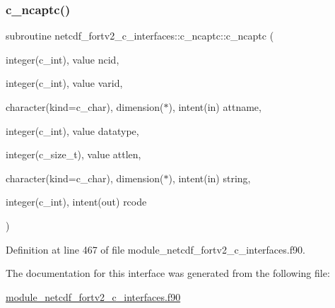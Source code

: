 \subsubsection{\texorpdfstring{c\+\_\+ncaptc()}{c\_ncaptc()}}
{\footnotesize\ttfamily subroutine netcdf\+\_\+fortv2\+\_\+c\+\_\+interfaces\+::c\+\_\+ncaptc\+::c\+\_\+ncaptc (\begin{DoxyParamCaption}\item[{integer(c\+\_\+int), value}]{ncid,  }\item[{integer(c\+\_\+int), value}]{varid,  }\item[{character(kind=c\+\_\+char), dimension($\ast$), intent(in)}]{attname,  }\item[{integer(c\+\_\+int), value}]{datatype,  }\item[{integer(c\+\_\+size\+\_\+t), value}]{attlen,  }\item[{character(kind=c\+\_\+char), dimension($\ast$), intent(in)}]{string,  }\item[{integer(c\+\_\+int), intent(out)}]{rcode }\end{DoxyParamCaption})}



Definition at line 467 of file module\+\_\+netcdf\+\_\+fortv2\+\_\+c\+\_\+interfaces.\+f90.



The documentation for this interface was generated from the following file\+:\begin{DoxyCompactItemize}
\item 
\hyperlink{module__netcdf__fortv2__c__interfaces_8f90}{module\+\_\+netcdf\+\_\+fortv2\+\_\+c\+\_\+interfaces.\+f90}\end{DoxyCompactItemize}
